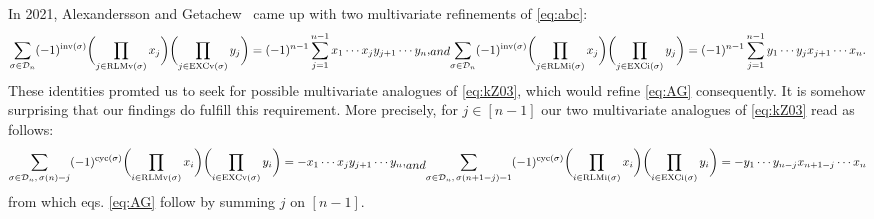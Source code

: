 \documentclass[12pt,reqno]{amsart}
\numberwithin{equation}{section}
\newcommand\inv{\mathop{ \rm inv}}
\newcommand\cyc{\mathop{ \rm cyc}}
\def\D{\mathcal{D}}
\def\cyc{\mathop{\rm cyc}}
\begin{document}
In 2021, 
Alexandersson and Getachew~\cite{AG21, AG21a} came up with two multivariate refinements of \eqref{eq:abc}:
\begin{subequations}\label{eq:AG}
\begin{align}\label{eq:AG1}
\sum_{\sigma\in \D_{n}}(-1)^{\inv( \sigma)}
\biggl( \prod_{j\in \mathrm{RLMv}(\sigma)}x_j \biggr) 
\biggl( \prod_{j\in \mathrm{EXCv}(\sigma)}y_j \biggr)  =(-1)^{n-1}\sum_{j=1}^{n-1}x_1\cdots x_j y_{j+1}\cdots y_n,
\end{align}
and 
\begin{align}\label{eq:AG2}
\sum_{\sigma\in \D_{n}}(-1)^{\inv( \sigma)}
\biggl( \prod_{j\in \mathrm{RLMi}(\sigma)}x_j \biggr) 
\biggl( \prod_{j\in \mathrm{EXCi}(\sigma)}y_j \biggr)  =(-1)^{n-1}\sum_{j=1}^{n-1}y_1\cdots y_j x_{j+1}\cdots x_n.
\end{align}
\end{subequations}
These identities promted us to seek for 
 possible multivariate analogues of \eqref{eq:kZ03}, 
 which would  refine  \eqref{eq:AG} consequently.  It is somehow surprising that 
our findings  do fulfill this requirement.
More precisely, for $j\in [n-1]$ our
two  multivariate analogues of \eqref{eq:kZ03}  read as follows:
\begin{subequations}\label{thm:PZ}
\begin{align}\label{thm:pz1}
	\sum_{\sigma\in \D_{n}, \, \sigma(n)=j}(-1)^{\cyc (\sigma)}
	\biggl( \prod_{i\in \mathrm{RLMv}(\sigma)}x_i \biggr) 
	\biggl( \prod_{i\in \mathrm{EXCv}(\sigma)}y_i \biggr)  =-x_1\cdots x_j y_{j+1}\cdots y_n,
\end{align}	
and 
\begin{align}\label{thm:pz2}
	\sum_{\sigma\in \D_{n}, \,\sigma(n+1-j)=1}(-1)^{\cyc (\sigma)}
	\biggl( \prod_{i\in \mathrm{RLMi}(\sigma)}x_i \biggr) 
	\biggl( \prod_{i\in \mathrm{EXCi}(\sigma)}y_i \biggr)  
	=- y_{1}\cdots y_{n-j}x_{n+1-j}\cdots x_n
\end{align}
\end{subequations}
from which  eqs. \eqref{eq:AG} follow by summing $j$ on $[n-1]$. 
\end{document}
